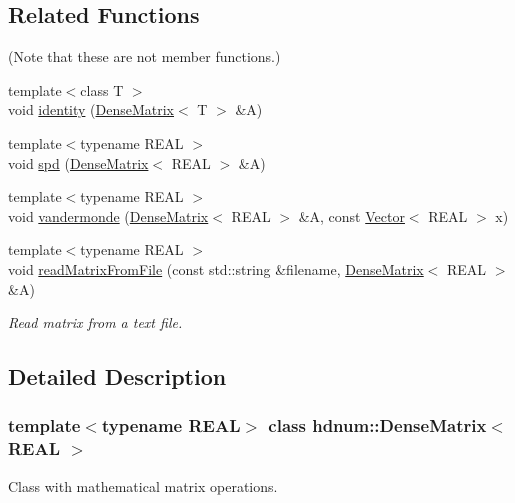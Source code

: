 \subsection*{Related Functions}
(Note that these are not member functions.) \begin{DoxyCompactItemize}
\item 
{\footnotesize template$<$class T $>$ }\\void \hyperlink{classhdnum_1_1DenseMatrix_a7827fbef0d569f0b605a6a260e1571f3}{identity} (\hyperlink{classhdnum_1_1DenseMatrix}{DenseMatrix}$<$ T $>$ \&A)
\item 
{\footnotesize template$<$typename REAL $>$ }\\void \hyperlink{classhdnum_1_1DenseMatrix_a2a328e8b5dca944a17fce76e1a51c7ae}{spd} (\hyperlink{classhdnum_1_1DenseMatrix}{DenseMatrix}$<$ REAL $>$ \&A)
\item 
{\footnotesize template$<$typename REAL $>$ }\\void \hyperlink{classhdnum_1_1DenseMatrix_a1ed8c7d92b4b38e3e48eaf3a8cce1d27}{vandermonde} (\hyperlink{classhdnum_1_1DenseMatrix}{DenseMatrix}$<$ REAL $>$ \&A, const \hyperlink{classhdnum_1_1Vector}{Vector}$<$ REAL $>$ x)
\item 
{\footnotesize template$<$typename REAL $>$ }\\void \hyperlink{classhdnum_1_1DenseMatrix_a5c106d0beabd399734dd2b1a6637626e}{readMatrixFromFile} (const std::string \&filename, \hyperlink{classhdnum_1_1DenseMatrix}{DenseMatrix}$<$ REAL $>$ \&A)
\begin{DoxyCompactList}\small\item\em Read matrix from a text file. \item\end{DoxyCompactList}\end{DoxyCompactItemize}


\subsection{Detailed Description}
\subsubsection*{template$<$typename REAL$>$ class hdnum::DenseMatrix$<$ REAL $>$}

Class with mathematical matrix operations. 

